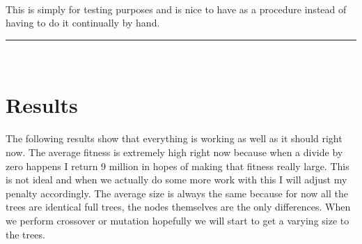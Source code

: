 \documentclass[paper=a4, fontsize=11pt]{scrartcl} %
\numberwithin{equation}{section} %
\numberwithin{figure}{section} %
\numberwithin{table}{section} %
\newcommand{\horrule}[1]{\rule{\linewidth}{#1}} %
\begin{document}
\paragraph{} This is simply for testing purposes and is nice to have as a procedure instead of having to do it continually by hand.

\pagebreak
\horrule{0.5pt} \\[0.4cm] %
\section{Results}


\paragraph{} The following results show that everything is working as well as it should right now. The average fitness is extremely high right now because when a divide by zero happens I return 9 million in hopes of making that fitness really large. This is not ideal and when we actually do some more work with this I will adjust my penalty accordingly. The average size is always the same because for now all the trees are identical full trees, the nodes themselves are the only differences. When we perform crossover or mutation hopefully we will start to get a varying size to the trees.
\end{document}
